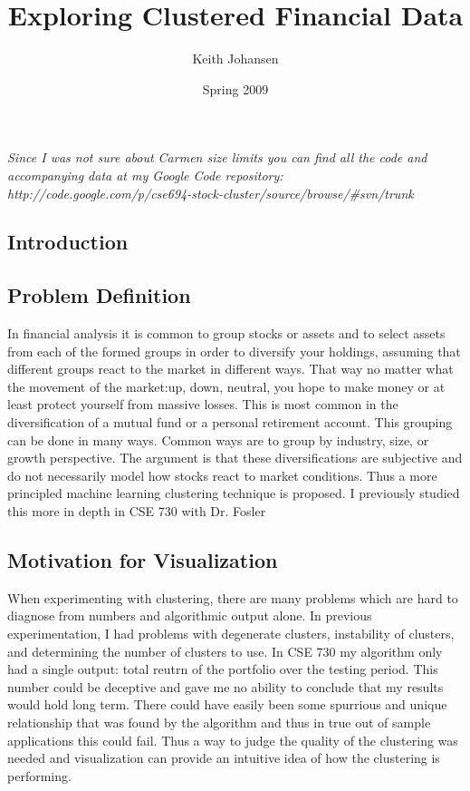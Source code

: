 \documentclass{article}
\author{Keith Johansen}
\title{Exploring Clustered Financial Data}
\date{Spring 2009}
\begin{document}
\maketitle


\noindent \textit{Since I was not sure about Carmen size limits you can find all the code and accompanying data at my Google Code repository: http://code.google.com/p/cse694-stock-cluster/source/browse/\#svn/trunk}
\begin{multicols}{2}
\section{Introduction}
\subsection{Problem Definition}
In financial analysis it is common to group stocks or assets and to select assets from each of the formed groups in order to diversify your holdings, assuming that different groups react to the market in different ways.  That way no matter what the movement of the market:up, down, neutral, you hope to make money or at least protect yourself from massive losses.   This is most common in the diversification of a mutual fund or a personal retirement account.  This grouping can be done in many ways.  Common ways are to group by industry, size, or growth perspective.  The argument is that these diversifications are subjective and do not necessarily model how stocks react to market conditions.  Thus a more principled machine learning clustering technique is proposed. I previously studied this more in depth in CSE 730 with Dr. Fosler

\subsection{Motivation for Visualization}
When experimenting with clustering, there are many problems which are hard to diagnose from numbers and algorithmic output alone.  In previous experimentation, I had problems with degenerate clusters, instability of clusters, and determining the number of clusters to use.  In CSE 730 my algorithm only had a single output: total reutrn of the portfolio over the testing period.  This number could be deceptive and gave me no ability to conclude that my results would hold long term.  There could have easily been some spurrious and unique relationship that was found by the algorithm and thus in true out of sample applications this could fail.  Thus a way to judge the quality of the clustering was needed and visualization can provide an intuitive idea of how the clustering is performing.

\end{multicols}
\end{document}
